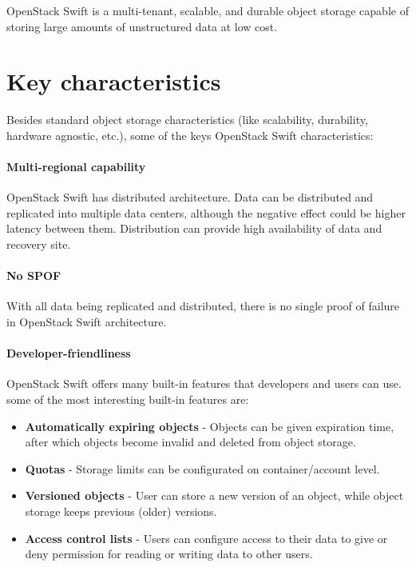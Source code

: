     OpenStack Swift is a multi-tenant, scalable, and durable object storage capable of storing large amounts of unstructured data at low cost\cite{swiftOpenStackSwift}.

    \section{Key characteristics}
    Besides standard object storage characteristics (like scalability, durability, hardware agnostic, etc.), some of the keys OpenStack Swift characteristics:

    \paragraph{Multi-regional capability}
    OpenStack Swift has distributed architecture. Data can be distributed and replicated into multiple data centers, although the negative effect could be higher latency between them. Distribution can provide high availability of data and recovery site\cite{swiftOpenStackSwift}.

    \paragraph{No SPOF}
    With all data being replicated and distributed, there is no single proof of failure in OpenStack Swift architecture.

    \paragraph{Developer-friendliness}
    OpenStack Swift offers many built-in features that developers and users can use. some of the most interesting built-in features are\cite{swiftOpenStackSwift}:
    \begin{itemize}
        \item \textbf{Automatically expiring objects} - Objects can be given expiration time, after which objects become invalid and deleted from object storage.
        \item \textbf{Quotas} - Storage limits can be configurated on container/account level.
        \item \textbf{Versioned objects} - User can store a new version of an object, while object storage keeps previous (older) versions.
        \item \textbf{Access control lists} - Users can configure access to their data to give or deny permission for reading or writing data to other users.
    \end{itemize}

